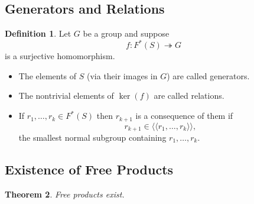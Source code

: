 \documentclass[11pt,a4paper]{article}
\theoremstyle{definition}
\newtheorem{definition}{Definition}[section]
\theoremstyle{plain}
\newtheorem{theorem}[definition]{Theorem}
\theoremstyle{remark}
\newcommand{\1}{\mathbbm{1}}
\begin{document}
\subsection*{Generators and Relations}

\begin{definition}
Let $G$ be a group and suppose
\[
f : F^*(S) \twoheadrightarrow G
\]
is a surjective homomorphism.

\begin{itemize}
\item The elements of $S$ (via their images in $G$) are called
generators.
\item The nontrivial elements of $\ker(f)$ are called relations.
\item If $r_1,\dots,r_k\in F^*(S)$ then $r_{k+1}$ is a consequence
of them if
\[
r_{k+1}\in \langle\!\langle r_1,\dots,r_k\rangle\!\rangle,
\]
the smallest normal subgroup containing $r_1,\dots,r_k$.
\end{itemize}
\end{definition}

\subsection*{Existence of Free Products}

\begin{theorem}
Free products exist.
\end{theorem}
\end{document}
